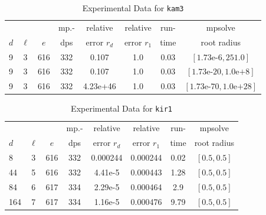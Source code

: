 \documentclass[runningheads]{llncs}
\begin{document}
\begin{table}
\caption{Experimental Data for \texttt{kam3}} %
\label{tab:kam3}
\vskip -0.15in
\begin{center}
\begin{small}
\begin{sc}
\begin{tabular}{lccccccc}
\toprule
&  &  & mp.-& relative  & relative & run- & mpsolve \\
$d$& $\ell$& $e$ & dps&error $r_d$       & error $r_1$ &time& root radius\\
\midrule
 9 & 3 & 616 & 332 & 0.107 & 1.0 & 0.03 & $[1.73\text{e-}6, 251.0]$\\
 9 & 3 & 616 & 332 & 0.107 & 1.0 & 0.03 & $[1.73\text{e-}20, 1.0\text{e+}8]$\\
 9 & 3 & 616 & 332 & 4.23e+46 & 1.0 & 0.03 & $[1.73\text{e-}70, 1.0\text{e+}28]$\\
\bottomrule
\end{tabular}
\end{sc}
\end{small}
\end{center}
\vskip 0.05in
\end{table}

\begin{table}
\caption{Experimental Data for \texttt{kir1}} %
\label{tab:kir1}
\vskip -0.15in
\begin{center}
\begin{small}
\begin{sc}
\begin{tabular}{lccccccc}
\toprule
&  &  & mp.-& relative  & relative & run- & mpsolve \\
$d$& $\ell$& $e$ & dps&error $r_d$       & error $r_1$ &time& root radius\\
\midrule
 8 & 3 & 616 & 332 & 0.000244 & 0.000244 & 0.02 & $[0.5, 0.5]$\\ %
 44 & 5 & 616 & 332 & 4.41e-5 & 0.000443 & 1.28 & $[0.5, 0.5]$\\
  84 & 6 & 617 & 334 & 2.29e-5 & 0.000464 & 2.9 & $[0.5, 0.5]$\\
 164 & 7 & 617 & 334 & 1.16e-5 & 0.000476 & 9.79 & $[0.5, 0.5]$\\
\bottomrule
\end{tabular}
\end{sc}
\end{small}
\end{center}
\vskip 0.05in
\end{table}
\end{document}
